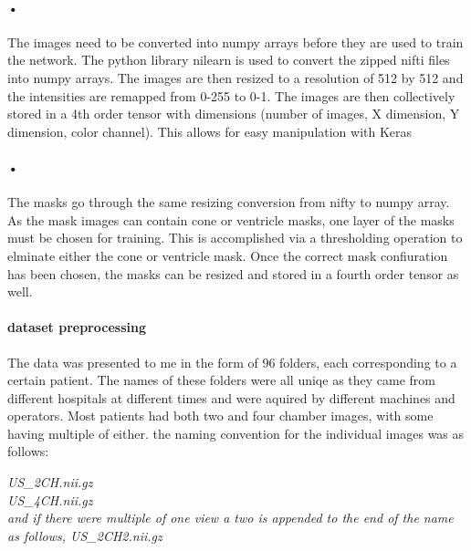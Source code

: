 \documentclass{article}
\begin{document}
\paragraph{•}
The images need to be converted into numpy arrays before they are used to train the network. The python library nilearn is used to convert the zipped nifti files into numpy arrays. The images are then resized to a resolution of 512 by 512 and the intensities are remapped from 0-255 to 0-1. The images are then collectively stored in a 4th order tensor with dimensions (number of images, X dimension, Y dimension, color channel). This allows for easy manipulation with Keras
\paragraph{•}
The masks go through the same resizing conversion from nifty to numpy array. As the mask images can contain cone or ventricle masks, one layer of the masks must be chosen for training. This is accomplished via a thresholding operation to elminate either the cone or ventricle mask. Once the correct mask confiuration has been chosen, the masks can be resized and stored in a fourth order tensor as well.
\paragraph{dataset preprocessing}
The data was presented to me in the form of 96 folders, each corresponding to a certain patient.
The names of these folders were all uniqe as they came from different hospitals at different times and were aquired by different machines and operators.
Most patients had both two and four chamber images, with some having multiple of either. 
the naming convention for the individual images was as follows:

\it{US\_2CH.nii.gz}\\
\it{US\_4CH.nii.gz}\\

and if there were multiple of one view a two is appended to the end of the name as follows,
\it{US\_2CH2.nii.gz}\\
\end{document}

